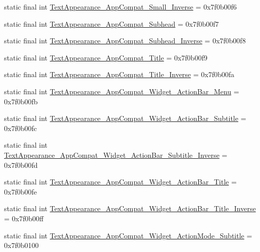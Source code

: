 \begin{CompactItemize}
static final int \hyperlink{classandroid_1_1support_1_1v7_1_1recyclerview_1_1_r_1_1style_5d4b8e02380602685dad80c8dac8e516}{TextAppearance\_\-AppCompat\_\-Small\_\-Inverse} = 0x7f0b00f6
\item 
static final int \hyperlink{classandroid_1_1support_1_1v7_1_1recyclerview_1_1_r_1_1style_aee5e1f265dc3f2b68b8c595f30d5bd8}{TextAppearance\_\-AppCompat\_\-Subhead} = 0x7f0b00f7
\item 
static final int \hyperlink{classandroid_1_1support_1_1v7_1_1recyclerview_1_1_r_1_1style_4c657c1e164a3376876111a68f35c2d0}{TextAppearance\_\-AppCompat\_\-Subhead\_\-Inverse} = 0x7f0b00f8
\item 
static final int \hyperlink{classandroid_1_1support_1_1v7_1_1recyclerview_1_1_r_1_1style_e0885b6d7a05304a4b840e2f2803957c}{TextAppearance\_\-AppCompat\_\-Title} = 0x7f0b00f9
\item 
static final int \hyperlink{classandroid_1_1support_1_1v7_1_1recyclerview_1_1_r_1_1style_2a153a8cc4ae71536b93cb4aa992922d}{TextAppearance\_\-AppCompat\_\-Title\_\-Inverse} = 0x7f0b00fa
\item 
static final int \hyperlink{classandroid_1_1support_1_1v7_1_1recyclerview_1_1_r_1_1style_ed1d3aae4b787920dd0102a382b2f62a}{TextAppearance\_\-AppCompat\_\-Widget\_\-ActionBar\_\-Menu} = 0x7f0b00fb
\item 
static final int \hyperlink{classandroid_1_1support_1_1v7_1_1recyclerview_1_1_r_1_1style_9aa1089740f5098e5158153593da3554}{TextAppearance\_\-AppCompat\_\-Widget\_\-ActionBar\_\-Subtitle} = 0x7f0b00fc
\item 
static final int \hyperlink{classandroid_1_1support_1_1v7_1_1recyclerview_1_1_r_1_1style_bb524d16bd2f8d4901f5d00c310f12b4}{TextAppearance\_\-AppCompat\_\-Widget\_\-ActionBar\_\-Subtitle\_\-Inverse} = 0x7f0b00fd
\item 
static final int \hyperlink{classandroid_1_1support_1_1v7_1_1recyclerview_1_1_r_1_1style_3c9ccdfc7bfb86bfbabbf73b41328b05}{TextAppearance\_\-AppCompat\_\-Widget\_\-ActionBar\_\-Title} = 0x7f0b00fe
\item 
static final int \hyperlink{classandroid_1_1support_1_1v7_1_1recyclerview_1_1_r_1_1style_9ce89de7c1fdfaf6f5e7f0fbed5ea7d2}{TextAppearance\_\-AppCompat\_\-Widget\_\-ActionBar\_\-Title\_\-Inverse} = 0x7f0b00ff
\item 
static final int \hyperlink{classandroid_1_1support_1_1v7_1_1recyclerview_1_1_r_1_1style_345fb3ddb3443be3e1237369bf502905}{TextAppearance\_\-AppCompat\_\-Widget\_\-ActionMode\_\-Subtitle} = 0x7f0b0100
\item 

\end{CompactItemize}

